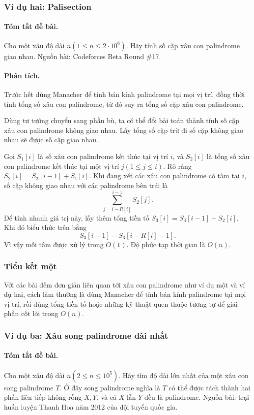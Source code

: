 \documentclass[11pt]{article}
\begin{document}
\subsubsection{Ví dụ hai: Palisection}

\paragraph{Tóm tắt đề bài.}
Cho một xâu độ dài \(n(1\le n\le2\cdot10^6)\). Hãy tính số cặp xâu con
palindrome giao nhau. Nguồn bài: Codeforces Beta Round \#17.

\paragraph{Phân tích.}
Trước hết dùng Manacher để tính bán kính palindrome tại mọi vị trí, đồng thời
tính tổng số xâu con palindrome, từ đó suy ra tổng số cặp xâu con palindrome.

Dùng tư tưởng chuyển sang phần bù, ta có thể đổi bài toán thành tính số cặp xâu
con palindrome không giao nhau. Lấy tổng số cặp trừ đi số cặp không giao nhau
sẽ được số cặp giao nhau.

Gọi \(S_1[i]\) là số xâu con palindrome kết thúc tại vị trí \(i\), và
\(S_2[i]\) là tổng số xâu con palindrome kết thúc tại một vị trí
\(j(1\le j\le i)\). Rõ ràng \(S_2[i]=S_2[i-1]+S_1[i]\). Khi đang xét các xâu
con palindrome có tâm tại \(i\), số cặp không giao nhau với các palindrome bên
trái là
\[
  \sum_{j=i-R[i]}^{i-1} S_2[j].
\]
Để tính nhanh giá trị này, lấy thêm tổng tiền tố
\(S_3[i]=S_3[i-1]+S_2[i]\). Khi đó biểu thức trên bằng
\[
  S_3[i-1]-S_3[i-R[i]-1].
\]
Vì vậy mỗi tâm được xử lý trong \(O(1)\). Độ phức tạp thời gian là \(O(n)\).

\subsubsection{Tiểu kết một}

Với các bài đếm đơn giản liên quan tới xâu con palindrome như ví dụ một và ví
dụ hai, cách làm thường là dùng Manacher để tính bán kính palindrome tại mọi vị
trí, rồi dùng tổng tiền tố hoặc những kỹ thuật quen thuộc tương tự để giải phần
cốt lõi trong \(O(n)\).

\subsubsection{Ví dụ ba: Xâu song palindrome dài nhất}

\paragraph{Tóm tắt đề bài.}
Cho một xâu độ dài \(n(2\le n\le10^5)\). Hãy tìm độ dài lớn nhất của một xâu
con song palindrome \(T\). Ở đây song palindrome nghĩa là \(T\) có thể được
tách thành hai phần liên tiếp không rỗng \(X,Y\), và cả \(X\) lẫn \(Y\) đều là
palindrome. Nguồn bài: trại huấn luyện Thanh Hoa năm 2012 của đội tuyển quốc
gia.
\end{document}
